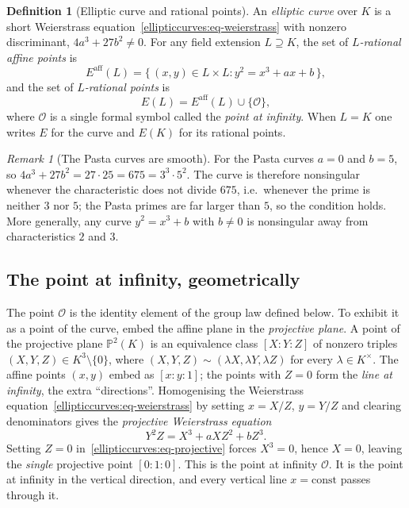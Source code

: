 \documentclass[11pt,a4paper]{article}
\theoremstyle{definition}
\newtheorem{definition}[theorem]{Definition}
\theoremstyle{remark}
\newtheorem{remark}[theorem]{Remark}
\begin{document}
\begin{definition}[Elliptic curve and rational points]
\label{ellipticcurves:def-curve}
An \emph{elliptic curve} over \(K\) is a short Weierstrass
equation~\eqref{ellipticcurves:eq-weierstrass} with nonzero
discriminant, \(4a^3 + 27b^2 \neq 0\). For any field extension
\(L \supseteq K\), the set of \emph{\(L\)-rational affine points} is
\[
  E^{\mathrm{aff}}(L)
  = \{\, (x,y) \in L \times L : y^2 = x^3 + ax + b \,\},
\]
and the set of \emph{\(L\)-rational points} is
\[
  E(L) = E^{\mathrm{aff}}(L) \cup \{\mathcal{O}\},
\]
where \(\mathcal{O}\) is a single formal symbol called the \emph{point
at infinity}. When \(L = K\) one writes \(E\) for the curve and
\(E(K)\) for its rational points.
\end{definition}

\begin{remark}[The Pasta curves are smooth]
\label{ellipticcurves:rem-pasta-smooth}
For the Pasta curves \(a = 0\) and \(b = 5\), so
\(4a^3 + 27b^2 = 27 \cdot 25 = 675 = 3^3 \cdot 5^2\). The curve is
therefore nonsingular whenever the characteristic does not divide
\(675\), i.e.\ whenever the prime is neither \(3\) nor \(5\); the Pasta
primes are far larger than \(5\), so the condition holds. More generally,
any curve
\(y^2 = x^3 + b\) with \(b \neq 0\) is nonsingular away from
characteristics \(2\) and \(3\).
\end{remark}

\subsection{The point at infinity, geometrically}
\label{ellipticcurves:subsec-infinity}

The point \(\mathcal{O}\) is the identity element of the group law
defined below. To exhibit it as a point of the curve, embed the affine
plane in the \emph{projective plane}. A
point of the projective plane \(\mathbb{P}^2(K)\) is an
equivalence class \([X : Y : Z]\) of nonzero triples
\((X, Y, Z) \in K^3 \setminus \{0\}\), where
\((X,Y,Z) \sim (\lambda X, \lambda Y, \lambda Z)\) for every
\(\lambda \in K^{\times}\). The affine points \((x, y)\) embed as
\([x : y : 1]\); the points with \(Z = 0\) form the \emph{line at
infinity}, the extra ``directions''. Homogenising the Weierstrass
equation~\eqref{ellipticcurves:eq-weierstrass} by setting
\(x = X/Z\), \(y = Y/Z\) and clearing denominators gives the
\emph{projective Weierstrass equation}
\begin{equation}\label{ellipticcurves:eq-projective}
  Y^2 Z = X^3 + a X Z^2 + b Z^3 .
\end{equation}
Setting \(Z = 0\) in~\eqref{ellipticcurves:eq-projective} forces
\(X^3 = 0\), hence \(X = 0\), leaving the \emph{single} projective
point \([0 : 1 : 0]\). This is the point at infinity \(\mathcal{O}\).
It is the point at infinity in the vertical direction, and every vertical
line \(x = \text{const}\) passes through it.
\end{document}
